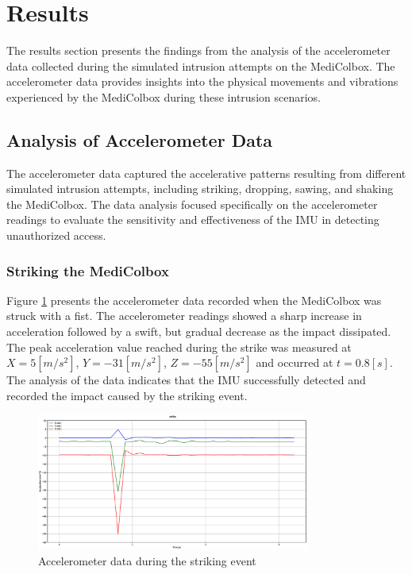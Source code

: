 \documentclass[../main.tex]{subfiles}
\begin{document}
\section{Results}
The results section presents the findings from the analysis of the accelerometer data collected during the simulated intrusion attempts on the MediColbox. The accelerometer data provides insights into the physical movements and vibrations experienced by the MediColbox during these intrusion scenarios.

\subsection{Analysis of Accelerometer Data}

The accelerometer data captured the accelerative patterns resulting from different simulated intrusion attempts, including striking, dropping, sawing, and shaking the MediColbox. The data analysis focused specifically on the accelerometer readings to evaluate the sensitivity and effectiveness of the IMU in detecting unauthorized access.

\clearpage

\subsubsection{Striking the MediColbox}

Figure \ref{fig:accelerometer_striking} presents the
accelerometer data recorded when the MediColbox was
struck with a fist.
The accelerometer readings showed a sharp increase in
acceleration followed by a swift, but gradual decrease as
the impact dissipated.
The peak acceleration value reached during the
strike was measured at
$X = 5 [m/s^2]$, $Y = -31 [m/s^2]$, $Z = -55 [m/s^2]$
and occurred at $t = 0.8[s]$.
The analysis of the data indicates that the
IMU successfully detected and recorded the impact caused by the
striking event.

\begin{figure}[htbp]
\centering
\includegraphics[width=0.8\textwidth]{resources/figures/Acceleration_strike.eps}
\caption{Accelerometer data during the striking event}
\label{fig:accelerometer_striking}
\end{figure}
\end{document}
